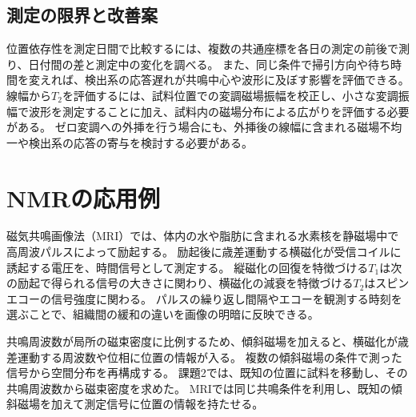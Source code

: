 \documentclass[dvipdfmx,a4paper,11pt]{jsarticle}
\begin{document}
\subsection{測定の限界と改善案}
位置依存性を測定日間で比較するには、複数の共通座標を各日の測定の前後で測り、日付間の差と測定中の変化を調べる。
また、同じ条件で掃引方向や待ち時間を変えれば、検出系の応答遅れが共鳴中心や波形に及ぼす影響を評価できる。
線幅から$T_2$を評価するには、試料位置での変調磁場振幅を校正し、小さな変調振幅で波形を測定することに加え、試料内の磁場分布による広がりを評価する必要がある。
ゼロ変調への外挿を行う場合にも、外挿後の線幅に含まれる磁場不均一や検出系の応答の寄与を検討する必要がある。

\clearpage
\section{NMRの応用例}
\label{sec:applications}

磁気共鳴画像法（MRI）では、体内の水や脂肪に含まれる水素核を静磁場中で高周波パルスによって励起する。
励起後に歳差運動する横磁化が受信コイルに誘起する電圧を、時間信号として測定する\cite{nibib_mri,mansfield_mri}。
縦磁化の回復を特徴づける$T_1$は次の励起で得られる信号の大きさに関わり、横磁化の減衰を特徴づける$T_2$はスピンエコーの信号強度に関わる。
パルスの繰り返し間隔やエコーを観測する時刻を選ぶことで、組織間の緩和の違いを画像の明暗に反映できる\cite{nibib_mri,mansfield_mri}。

共鳴周波数が局所の磁束密度に比例するため、傾斜磁場を加えると、横磁化が歳差運動する周波数や位相に位置の情報が入る。
複数の傾斜磁場の条件で測った信号から空間分布を再構成する\cite{mansfield_mri}。
課題2では、既知の位置に試料を移動し、その共鳴周波数から磁束密度を求めた。
MRIでは同じ共鳴条件を利用し、既知の傾斜磁場を加えて測定信号に位置の情報を持たせる。
\end{document}
